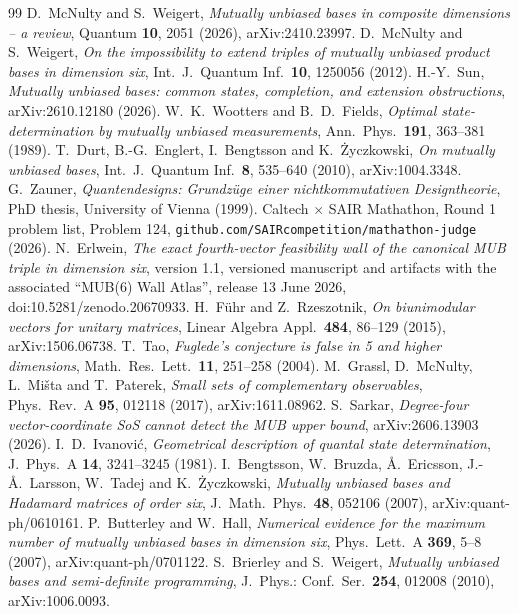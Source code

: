 \documentclass[11pt]{article}
\theoremstyle{definition}
\theoremstyle{remark}
\begin{document}
\begin{thebibliography}{99}
 D.~McNulty and S.~Weigert, \emph{Mutually unbiased bases in composite dimensions -- a review}, Quantum \textbf{10}, 2051 (2026), arXiv:2410.23997.
 D.~McNulty and S.~Weigert, \emph{On the impossibility to extend triples of mutually unbiased product bases in dimension six}, Int.\ J.\ Quantum Inf.\ \textbf{10}, 1250056 (2012).
 H.-Y.~Sun, \emph{Mutually unbiased bases: common states, completion, and extension obstructions}, arXiv:2610.12180 (2026).
 W.~K.~Wootters and B.~D.~Fields, \emph{Optimal state-determination by mutually unbiased measurements}, Ann.\ Phys.\ \textbf{191}, 363--381 (1989).
 T.~Durt, B.-G.~Englert, I.~Bengtsson and K.~\.Zyczkowski, \emph{On mutually unbiased bases}, Int.\ J.\ Quantum Inf.\ \textbf{8}, 535--640 (2010), arXiv:1004.3348.
 G.~Zauner, \emph{Quantendesigns: Grundz\"uge einer nichtkommutativen Designtheorie}, PhD thesis, University of Vienna (1999).
 Caltech $\times$ SAIR Mathathon, Round 1 problem list, Problem 124, \texttt{github.com/SAIRcompetition/mathathon-judge} (2026).
 N.~Erlwein, \emph{The exact fourth-vector feasibility wall of the canonical MUB triple in dimension six}, version 1.1, versioned manuscript and artifacts with the associated ``MUB(6) Wall Atlas'', release 13 June 2026, doi:10.5281/zenodo.20670933.
 H.~F\"uhr and Z.~Rzeszotnik, \emph{On biunimodular vectors for unitary matrices}, Linear Algebra Appl.\ \textbf{484}, 86--129 (2015), arXiv:1506.06738.
 T.~Tao, \emph{Fuglede's conjecture is false in 5 and higher dimensions}, Math.\ Res.\ Lett.\ \textbf{11}, 251--258 (2004).
 M.~Grassl, D.~McNulty, L.~Mi\v{s}ta and T.~Paterek, \emph{Small sets of complementary observables}, Phys.\ Rev.\ A \textbf{95}, 012118 (2017), arXiv:1611.08962.
 S.~Sarkar, \emph{Degree-four vector-coordinate SoS cannot detect the MUB upper bound}, arXiv:2606.13903 (2026).
 I.~D.~Ivanovi\'c, \emph{Geometrical description of quantal state determination}, J.\ Phys.\ A \textbf{14}, 3241--3245 (1981).
 I.~Bengtsson, W.~Bruzda, \AA.~Ericsson, J.-\AA.~Larsson, W.~Tadej and K.~\.Zyczkowski, \emph{Mutually unbiased bases and Hadamard matrices of order six}, J.\ Math.\ Phys.\ \textbf{48}, 052106 (2007), arXiv:quant-ph/0610161.
 P.~Butterley and W.~Hall, \emph{Numerical evidence for the maximum number of mutually unbiased bases in dimension six}, Phys.\ Lett.\ A \textbf{369}, 5--8 (2007), arXiv:quant-ph/0701122.
 S.~Brierley and S.~Weigert, \emph{Mutually unbiased bases and semi-definite programming}, J.\ Phys.: Conf.\ Ser.\ \textbf{254}, 012008 (2010), arXiv:1006.0093.

\end{thebibliography}
\end{document}
